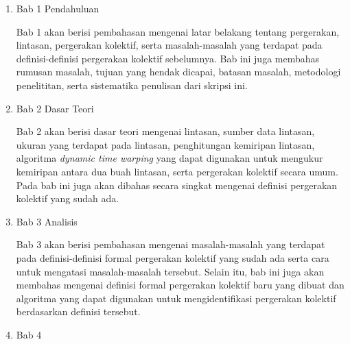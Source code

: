 \begin{enumerate}
    \item Bab 1 Pendahuluan
    
    Bab 1 akan berisi pembahasan mengenai latar belakang tentang pergerakan, lintasan, pergerakan kolektif, serta masalah-masalah yang terdapat pada definisi-definisi pergerakan kolektif sebelumnya. Bab ini juga membahas rumusan masalah, tujuan yang hendak dicapai, batasan masalah, metodologi penelititan, serta sistematika penulisan dari skripsi ini.
    
    \item Bab 2 Dasar Teori
    
    Bab 2 akan berisi dasar teori mengenai lintasan, sumber data lintasan, ukuran yang terdapat pada lintasan, penghitungan kemiripan lintasan, algoritma \textit{dynamic time warping} yang dapat digunakan untuk mengukur kemiripan antara dua buah lintasan, serta pergerakan kolektif secara umum. Pada bab ini juga akan dibahas secara singkat mengenai definisi pergerakan kolektif yang sudah ada.
    
    \item Bab 3 Analisis
    
    Bab 3 akan berisi pembahasan mengenai masalah-masalah yang terdapat pada definisi-definisi formal pergerakan kolektif yang sudah ada serta cara untuk mengatasi masalah-masalah tersebut. Selain itu, bab ini juga akan membahas mengenai definisi formal pergerakan kolektif baru yang dibuat dan algoritma yang dapat digunakan untuk mengidentifikasi pergerakan kolektif berdasarkan definisi tersebut.
    
    \item Bab 4
\end{enumerate}

\iffalse

Rencananya Bab 2 akan berisi petunjuk penggunaan template dan dasar-dasar \LaTeX.
Mungkin bab 3,4,5 dapt diisi oleh ketiga jurusan, misalnya peraturan dasar skripsi atau pedoman penulisan, tentu jika berkenan.
Bab 6 akan diisi dengan kesimpulan, bahwa membuat template ini ternyata sungguh menghabiskan banyak waktu.

\dtext{10}

\fi